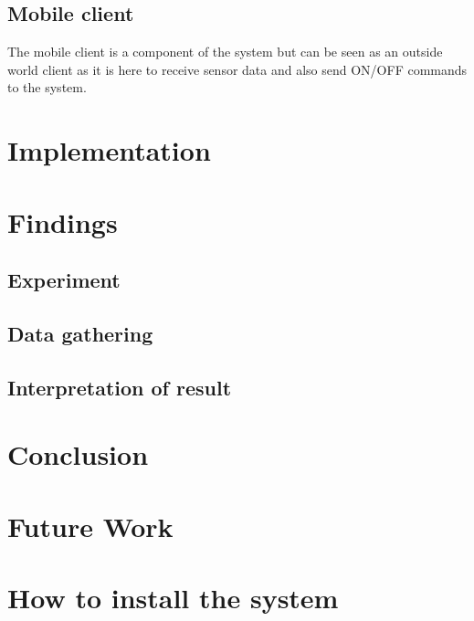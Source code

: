 \documentclass[oneside,12pt,a4paper,final]{book}
\begin{document}
\section{Mobile client}
The mobile client is a component of the system but can be seen as an outside world client as it is here to receive sensor data and also send ON/OFF commands to the system.
\chapter{Implementation}

\chapter{Findings}
\section{Experiment}
\section{Data gathering}
\section{Interpretation of result}

\chapter{Conclusion}

\chapter{Future Work}

\appendix
\chapter{How to install the system}

\backmatter

\singlespacing
\printglossaries
 

\end{document}
